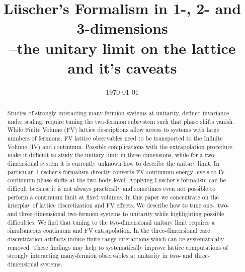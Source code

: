\documentclass[aps,superscriptaddress,tightenlines,nofootinbib,floatfix,longbibliography,notitlepage]{revtex4-1}
\begin{document}
\title{L\"{u}scher's Formalism in 1-, 2- and 3-dimensions\\--the unitary limit on the lattice and it's caveats}





\date{\today}

\begin{abstract}
Studies of strongly interacting many-fermion systems at unitarity, defined invariance under scaling, require tuning the two-fermion subsystem such that phase shifts vanish.
While Finite Volume (FV) lattice descriptions allow access to systems with large numbers of fermions, FV lattice observables need to be transported to the Infinite Volume (IV) and continuum.
Possible complications with the extrapolation procedure make it difficult to study the unitary limit in three-dimensions, while for a two-dimensional system it is currently unknown how to describe the unitary limit.
In particular, L\"{u}scher's formalism directly converts FV continuum energy levels to IV continuum phase shifts at the two-body level.
Applying L\"{u}scher's formalism can be difficult because it is not always practically and sometimes even not possible to perform a continuum limit at fixed volumes.
In this paper we concentrate on the interplay of lattice discretization and FV effects.
We describe how to tune one-, two- and three-dimensional two-fermion systems to unitarity while highlighting possible difficulties.
We find that tuning to the two-dimensional unitary limit requires a simultaneous continuum and FV extrapolation.
In the three-dimensional case discretization artifacts induce finite range interactions which can be systematically removed.
These findings may help to systematically improve lattice computations of strongly interacting many-fermion observables at unitarity in two- and three-dimensional systems.
\end{abstract}

\maketitle











\end{document}
